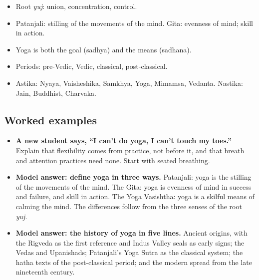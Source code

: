 \begin{recall}
\begin{itemize}
\item Root \emph{yuj}: union, concentration, control.
\item Patanjali: stilling of the movements of the mind. Gita: evenness of mind; skill in action.
\item Yoga is both the goal (sadhya) and the means (sadhana).
\item Periods: pre-Vedic, Vedic, classical, post-classical.
\item Astika: Nyaya, Vaisheshika, Samkhya, Yoga, Mimamsa, Vedanta. Nastika: Jain, Buddhist, Charvaka.
\end{itemize}
\end{recall}

\subsection*{Worked examples}
\begin{itemize}
\item \textbf{A new student says, ``I can't do yoga, I can't touch my toes.''} Explain that flexibility comes from practice, not before it, and that breath and attention practices need none. Start with seated breathing.
\item \textbf{Model answer: define yoga in three ways.} Patanjali: yoga is the stilling of the movements of the mind. The Gita: yoga is evenness of mind in success and failure, and skill in action. The Yoga Vasishtha: yoga is a skilful means of calming the mind. The differences follow from the three senses of the root \emph{yuj}.
\item \textbf{Model answer: the history of yoga in five lines.} Ancient origins, with the Rigveda as the first reference and Indus Valley seals as early signs; the Vedas and Upanishads; Patanjali's Yoga Sutra as the classical system; the hatha texts of the post-classical period; and the modern spread from the late nineteenth century.
\end{itemize}

